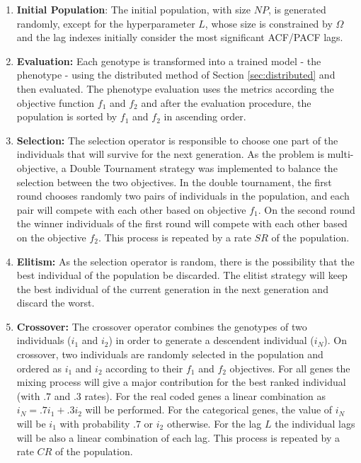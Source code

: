 \begin{enumerate}
    \item \textbf{Initial Population}: The initial population, with size $NP$, is generated randomly, except for the hyperparameter $L$, whose size is constrained by $\Omega$ and the lag indexes initially consider the most significant ACF/PACF lags.
    
    \item \textbf{Evaluation:} Each genotype is transformed into a trained model - the phenotype - using the distributed method of Section \ref{sec:distributed} and then evaluated. The phenotype evaluation uses the metrics according the objective function $f_1$ and $f_2$ and after the evaluation procedure, the population is sorted by $f_1$ and $f_2$ in ascending order.

    \item \textbf{Selection:} The selection operator is responsible to choose one part of the individuals that will survive for the next generation. As the problem is multi-objective, a Double Tournament strategy was implemented to balance the selection between the two objectives. In the double tournament, the first round chooses randomly two pairs of individuals in the population, and each pair will compete with each other based on objective $f_1$. On the second round the winner individuals of the first round will compete with each other based on the objective $f_2$. This process is repeated by a rate $SR$ of the population.
    
    \item \textbf{Elitism:} As the selection operator is random, there is the possibility that the best individual of the population be discarded. The elitist strategy will keep the best individual of the current generation in the next generation and discard the worst.

    \item \textbf{Crossover:} The crossover operator combines the genotypes of two individuals ($i_1$ and $i_2$) in order to generate a descendent individual ($i_N$). On crossover, two individuals are randomly selected in the population and ordered as $i_1$ and $i_2$ according to their $f_1$ and $f_2$ objectives. For all genes the mixing process will give a major contribution for the best ranked individual (with $.7$ and $.3$ rates). For the real coded genes a linear combination as $i_N = .7i_1 + .3i_2$ will be performed. For the categorical genes, the value of $i_N$ will be $i_1$ with probability $.7$ or $i_2$ otherwise. For the lag $L$ the individual lags will be also a linear combination of each lag. This process is repeated by a rate $CR$ of the population.


\end{enumerate}
